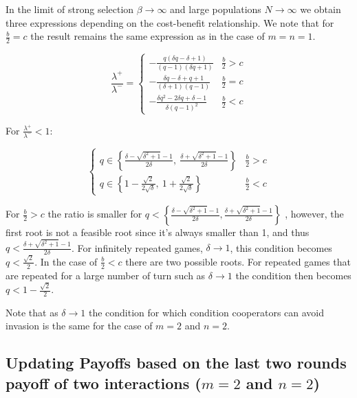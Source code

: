 \documentclass[11pt]{article}
\theoremstyle{plainCl1}
\theoremstyle{plainCl2}
\begin{document}
In the limit of strong selection \(\beta \rightarrow \infty\) and large
populations \(N \rightarrow \infty \) we obtain three expressions depending on
the cost-benefit relationship. We note that for \(\frac{b}{2}=c\) the result
remains the same expression as in the case of \(m=n=1\).

\begin{equation}
\frac{\lambda^{+}}{\lambda^{-}} = 
\begin{cases}
  - \frac{q \left(\delta q - \delta + 1\right)}{\left(q - 1\right) \left(\delta q + 1\right)}  & \frac{b}{2} > c \\[0.5cm]
  - \frac{\delta q - \delta + q + 1}{\left(\delta + 1\right) \left(q - 1\right)}  & \frac{b}{2} = c \\[0.5cm]
  - \frac{\delta q^{2} - 2 \delta q + \delta - 1}{\delta \left(q - 1\right)^{2}} & \frac{b}{2} < c
\end{cases}
\end{equation}

For \(\frac{\lambda^{+}}{\lambda^{-}} < 1\):

\begin{equation}
\begin{cases}
  q \in \left\{\frac{\delta - \sqrt{\delta^{2} + 1} - 1}{2 \delta}, \  \frac{\delta + \sqrt{\delta^{2} + 1} - 1}{2 \delta}\right\}  & \frac{b}{2} > c \\[0.5cm]
  q \in \left\{1 - \frac{\sqrt{2}}{2 \sqrt{\delta}}, \  1 + \frac{\sqrt{2}}{2 \sqrt{\delta}}\right\} & \frac{b}{2} < c
\end{cases}
\end{equation}

For \(\frac{b}{2}>c\) the ratio is smaller for
\(q < \left\{\frac{\delta - \sqrt{\delta^{2} + 1} - 1}{2 \delta}, \frac{\delta + \sqrt{\delta^{2} + 1} - 1}{2 \delta}\right\}\)
, however, the first root is not a feasible root since it's always smaller
than 1, and thus \(q < \frac{\delta + \sqrt{\delta^{2} + 1} - 1}{2 \delta}\). For
infinitely repeated games, \(\delta \rightarrow 1\), this condition becomes \(q
< \frac{\sqrt{2}}{2}\). In the case of \(\frac{b}{2}<c\) there are two possible
roots. For repeated games that are repeated for a large number of turn such as
\(\delta \rightarrow 1\) the condition then becomes \(q < 1 -
\frac{\sqrt{2}}{2}\).

Note that as \(\delta \rightarrow 1\) the condition for which condition
cooperators can avoid invasion is the same for the case of \(m=2\) and \(n=2\).

\subsection{Updating Payoffs based on the last two rounds payoff of two interactions (\(m=2\) and \(n=2\))}\label{section:m_two_n_two}
\end{document}

